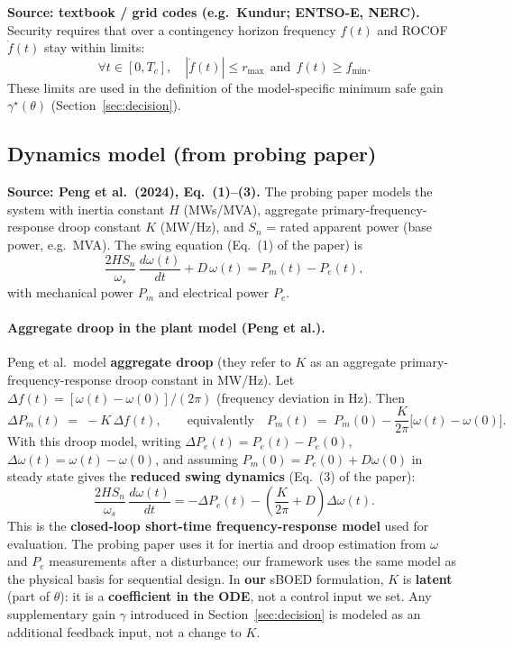 \documentclass[10pt]{article}
\begin{document}
\textbf{Source: textbook / grid codes (e.g.\ Kundur; ENTSO-E, NERC).} Security requires that over a contingency horizon frequency $f(t)$ and ROCOF $\dot f(t)$ stay within limits:
\[
\forall t\in[0,T_c],\quad |\dot f(t)|\le r_{\max}\ \ \text{and}\ \ f(t)\ge f_{\min}.
\]
These limits are used in the definition of the model-specific minimum safe gain $\gamma^\star(\theta)$ (Section~\ref{sec:decision}).

\subsection{Dynamics model (from probing paper)}
\label{sec:model}

\textbf{Source: Peng et al.\ (2024), Eq.\ (1)--(3).} The probing paper models the system with inertia constant $H$ (MWs/MVA), aggregate primary-frequency-response droop constant $K$ (MW/Hz), and $S_n$ = rated apparent power (base power, e.g.\ MVA). The swing equation (Eq.\ (1) of the paper) is
\[
\frac{2HS_n}{\omega_s}\,\frac{d\omega(t)}{dt}+D\,\omega(t)=P_m(t)-P_e(t),
\]
with mechanical power $P_m$ and electrical power $P_e$.

\paragraph{Aggregate droop in the plant model (Peng et al.).}
Peng et al.\ model \textbf{aggregate droop} (they refer to $K$ as an aggregate primary-frequency-response droop constant in MW/Hz). Let $\Delta f(t)=[\omega(t)-\omega(0)]/(2\pi)$ (frequency deviation in Hz). Then
\[
\Delta P_m(t)\;=\;-K\,\Delta f(t),
\qquad\text{equivalently}\quad
P_m(t)\;=\;P_m(0)-\frac{K}{2\pi}\big[\omega(t)-\omega(0)\big].
\]
With this droop model, writing $\Delta P_e(t)=P_e(t)-P_e(0)$, $\Delta\omega(t)=\omega(t)-\omega(0)$, and assuming $P_m(0)=P_e(0)+D\omega(0)$ in steady state gives the \textbf{reduced swing dynamics} (Eq.\ (3) of the paper):
\begin{equation}
\label{eq:swing3}
\boxed{\;\frac{2HS_n}{\omega_s}\,\frac{d\omega(t)}{dt}=-\Delta P_e(t)-\left(\frac{K}{2\pi}+D\right)\Delta\omega(t).\;}
\end{equation}
This is the \textbf{closed-loop short-time frequency-response model} used for evaluation. The probing paper uses it for inertia and droop estimation from $\omega$ and $P_e$ measurements after a disturbance; our framework uses the same model as the physical basis for sequential design. In \textbf{our} sBOED formulation, $K$ is \textbf{latent} (part of $\theta$): it is a \textbf{coefficient in the ODE}, not a control input we set. Any supplementary gain $\gamma$ introduced in Section~\ref{sec:decision} is modeled as an additional feedback input, not a change to $K$.
\end{document}
